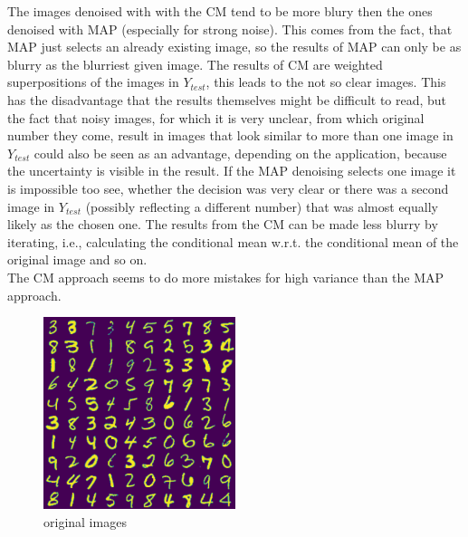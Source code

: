 \documentclass[english]{exercisesheet}
\begin{document}
\begin{solution}
The images denoised with with the CM tend to be more blury then the ones denoised with MAP (especially for strong noise). This comes from the fact, that MAP just selects an already existing image, so the results of MAP can only be as blurry as the blurriest given image. The results of CM are weighted superpositions of the images in $Y_{test}$, this leads to the not so clear images. This has the disadvantage that the results themselves might be difficult to read, but the fact that noisy images, for which it is very unclear, from which original number they come, result in images that look similar to more than one image in $Y_{test}$ could also be seen as an advantage, depending on the application, because the uncertainty is visible in the result. If the MAP denoising selects one image it is impossible too see, whether the decision was very clear or there was a second image in $Y_{test}$ (possibly reflecting a different number) that was almost equally likely as the chosen one. The results from the CM can be made less blurry by iterating, i.e., calculating the conditional mean w.r.t. the conditional mean of the original image and so on.\\
The CM approach seems to do more mistakes for high variance than the MAP approach.


\begin{figure}
\begin{center}
 \includegraphics[width=0.5\textwidth]{images/originals.pdf}
 \end{center}
 \caption{original images}
 \label{orgs}
\end{figure}


\end{solution}
\end{document}
